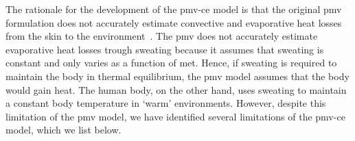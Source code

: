 The rationale for the development of the \ac{pmv-ce} model is that the original \ac{pmv} formulation does not accurately estimate convective and evaporative heat losses from the skin to the environment~\cite{huang_applicability_2014}.
The \ac{pmv} does not accurately estimate evaporative heat losses trough sweating because it assumes that sweating is constant and only varies as a function of \ac{met}. 
Hence, if sweating is required to maintain the body in thermal equilibrium, the \ac{pmv} model assumes that the body would gain heat.
The human body, on the other hand, uses sweating to maintain a constant body temperature in `warm' environments.
However, despite this limitation of the \ac{pmv} model, we have identified several limitations of the \ac{pmv-ce} model, which we list below.

